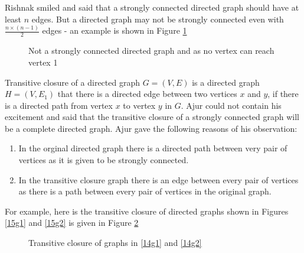 Rishnak smiled and said that a strongly connected directed graph should have at least $n$ edges. But a directed graph may not be strongly connected even with $\frac{n \times (n-1)}{2}$ edges - an example is shown in Figure \ref{15g3}
\begin{figure}
\begin{center}
\caption{ Not a strongly connected directed graph and as no vertex can reach vertex 1}\label{15g3}
\end{center}
\end{figure}

Transitive closure of a directed graph $G=(V,E)$ is a directed graph $H=(V,E_1)$ that there is a directed edge between two vertices $x$ and $y$, if there is a directed path from vertex $x$ to vertex $y$ in $G$. Ajur could not contain his excitement and said that the transitive closure of a strongly connected graph will be a complete directed graph. Ajur gave the following reasons of his observation:
\begin{enumerate}
    \item In the orginal directed graph there is a directed path between very pair of vertices as it is given to be strongly connected.
    \item In the transitive closure graph there is an edge between every pair of vertices as there is a path between every pair of vertices in the original graph.
\end{enumerate}

For example, here is the transitive closure of directed graphs shown in Figures \ref{15g1} and \ref{15g2} is given in Figure \ref{15g4}

\begin{figure}
\begin{center}
\caption{ Transitive closure of graphs in \ref{14g1} and \ref{14g2}}\label{15g4}
\end{center}
\end{figure}

